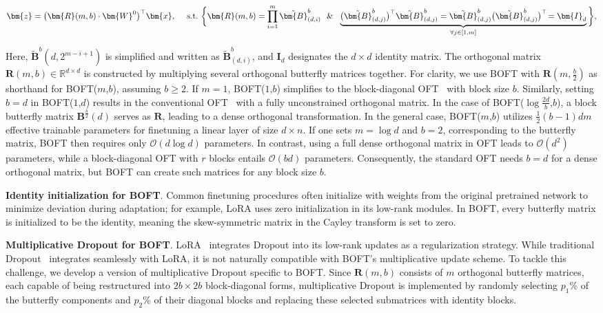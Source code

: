 \begin{equation}
    \begin{aligned}\nonumber
    \bm{z}=\big(\bm{R}(m,b)\cdot\bm{W}^0\big)^\top\bm{x},~~~~\text{s.t.}~\bigg{\{}\bm{R}(m,b)=\prod_{i=1}^m \tilde{\bm{B}}^b_{(d,i)}~~\&~~\underbrace{\big(\tilde{\bm{B}}^b_{(d,j)}\big)^\top\tilde{\bm{B}}^b_{(d,j)}=\tilde{\bm{B}}^b_{(d,j)}\big(\tilde{\bm{B}}^b_{(d,j)}\big)^\top\!=\bm{I}_d}_{\forall j\in [1, m]}\bigg{\}},
    \end{aligned}
\end{equation}

Here, $\tilde{\bm{B}}^b(d,2^{m - i+1})$ is simplified and written as $\tilde{\bm{B}}^b_{(d,i)}$, and $\bm{I}_d$ designates the $d \times d$ identity matrix. The orthogonal matrix $\bm{R}(m,b)\in\mathbb{R}^{d\times d}$ is constructed by multiplying several orthogonal butterfly matrices together. For clarity, we use BOFT with $\bm{R}(m,\frac{b}{2})$ as shorthand for BOFT($m$,$b$), assuming $b\geq 2$. If $m=1$, BOFT($1$,$b$) simplifies to the block-diagonal OFT~\cite{qiu2023controlling} with block size $b$. Similarly, setting $b=d$ in BOFT($1$,$d$) results in the conventional OFT~\cite{qiu2023controlling} with a fully unconstrained orthogonal matrix. In the case of BOFT($\log \frac{2d}{b}$,$b$), a block butterfly matrix $\bm{B}^{\frac{b}{2}}(d)$ serves as $\bm{R}$, leading to a dense orthogonal transformation. In the general case, BOFT($m$,$b$) utilizes $\frac{1}{2}(b-1)dm$ effective trainable parameters for finetuning a linear layer of size $d\times n$. If one sets $m = \log d$ and $b = 2$, corresponding to the butterfly matrix, BOFT then requires only $\mathcal{O}(d\log d)$ parameters. In contrast, using a full dense orthogonal matrix in OFT leads to $\mathcal{O}(d^2)$ parameters, while a block-diagonal OFT with $r$ blocks entails $\mathcal{O}(bd)$ parameters. Consequently, the standard OFT needs $b=d$ for a dense orthogonal matrix, but BOFT can create such matrices for any block size $b$.

\textbf{Identity initialization for BOFT}. Common finetuning procedures often initialize with weights from the original pretrained network to minimize deviation during adaptation; for example, LoRA uses zero initialization in its low-rank modules. In BOFT, every butterfly matrix is initialized to be the identity, meaning the skew-symmetric matrix in the Cayley transform is set to zero.

\textbf{Multiplicative Dropout for BOFT}. LoRA~\cite{hulora2022} integrates Dropout into its low-rank updates as a regularization strategy. While traditional Dropout~\cite{srivastava2014dropout} integrates seamlessly with LoRA, it is not naturally compatible with BOFT’s multiplicative update scheme. To tackle this challenge, we develop a version of multiplicative Dropout specific to BOFT. Since $\bm{R}(m,b)$ consists of $m$ orthogonal butterfly matrices, each capable of being restructured into $2b\times 2b$ block-diagonal forms, multiplicative Dropout is implemented by randomly selecting $p_1\%$ of the butterfly components and $p_2\%$ of their diagonal blocks and replacing these selected submatrices with identity blocks.

